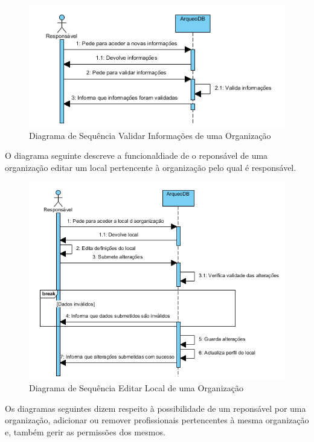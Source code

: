 ﻿\documentclass[12pt,a4paper]{article}
\begin{document}
\begin{figure}[h!]
\centering
\includegraphics[scale=1]{sequencia/validarinf}
\caption{Diagrama de Sequência Validar Informações de uma Organização}  
\end{figure}


\clearpage
O diagrama seguinte descreve a funcionaldiade de o reponsável de uma organização editar um local pertencente à organização pelo qual é responsável.\\

\begin{figure}[h!]
\centering
\includegraphics[scale=1]{sequencia/editarlocal}
\caption{Diagrama de Sequência Editar Local de uma Organização}  
\end{figure}

\clearpage
Os diagramas seguintes dizem respeito à possibilidade de um reponsável por uma organização, adicionar ou remover profissionais pertencentes à mesma organização e, também gerir as permissões dos mesmos.\\
\end{document}
